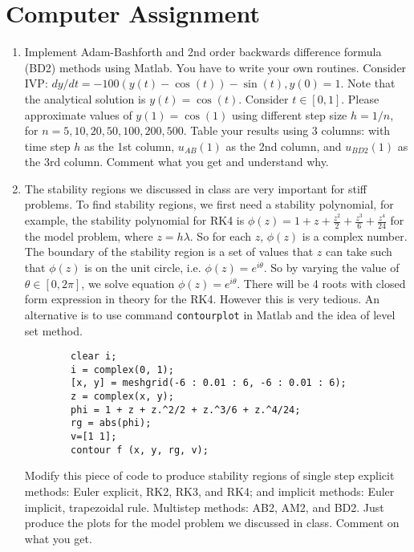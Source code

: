 \documentclass[10pt]{report}
\begin{document}
\section*{Computer Assignment}
\begin{enumerate}
	\item 
	Implement Adam-Bashforth and 2nd order backwards difference formula (BD2) methods using Matlab. You have to write your own routines. Consider IVP: $dy/dt = -100(y(t) - \cos(t)) - \sin(t), y(0) = 1$. Note that the analytical solution is $y(t) = \cos(t)$. Consider $t\in [0, 1]$. Please approximate values of $y(1) = \cos(1)$ using different step size $h = 1/n$, for $n = 5, 10, 20, 50, 100, 200, 500$. Table your results using 3 columns: with time step $h$ as the 1st column, $u_{AB}(1)$ as the 2nd column, and $u_{BD2}(1)$ as the 3rd column. Comment what you get and understand why.
	
	\item 
	The stability regions we discussed in class are very important for stiff problems. To find stability regions, we first need a stability polynomial, for example, the stability polynomial for RK4 is $\phi(z) = 1 + z + \frac{z^2}{2} + \frac{z^3}{6} + \frac{z^4}{24}$ for the model problem, where $z=h\lambda$. So for each $z$, $\phi(z)$ is a complex number. The boundary of the stability region is a set of values that $z$ can take such that $\phi(z)$ is on the unit circle, i.e. $\phi(z) = e^{i\theta}$. So by varying the value of $\theta\in [0, 2\pi]$, we solve equation $\phi(z) = e^{i\theta}$. There will be 4 roots with closed form expression in theory for the RK4. However this is very tedious. An alternative is to use command \texttt{contourplot} in Matlab and the idea of level set method.
	\begin{verbatim}
		clear i;
		i = complex(0, 1);
		[x, y] = meshgrid(-6 : 0.01 : 6, -6 : 0.01 : 6);
		z = complex(x, y);
		phi = 1 + z + z.^2/2 + z.^3/6 + z.^4/24;
		rg = abs(phi);
		v=[1 1];
		contour f (x, y, rg, v);
	\end{verbatim}
	Modify this piece of code to produce stability regions of single step explicit methods: Euler explicit, RK2, RK3, and RK4; and implicit methods: Euler implicit, trapezoidal rule. Multistep methods: AB2, AM2, and BD2. Just produce the plots for the model problem we discussed in class. Comment on what you get.
\end{enumerate}
\end{document}
